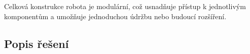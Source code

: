 Celková konstrukce robota je modulární, což usnadňuje přístup k jednotlivým komponentům a umožňuje jednoduchou údržbu nebo budoucí rozšíření.






\subsection{Popis řešení}

